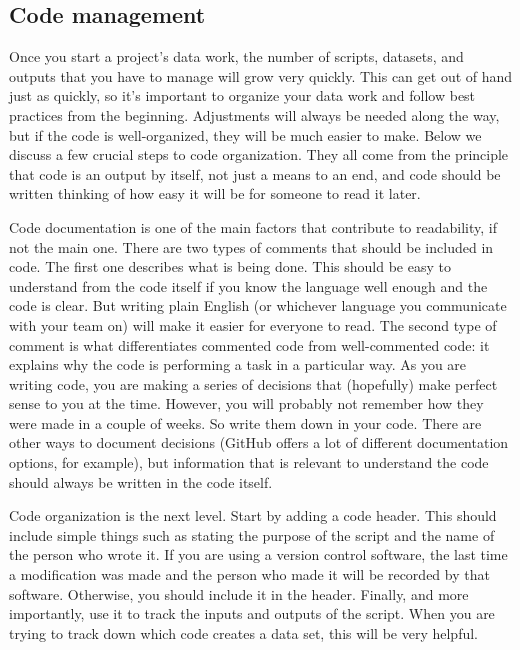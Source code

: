 \subsection{Code management}

Once you start a project's data work,
the number of scripts, datasets, and outputs that you have to manage will grow very quickly.
This can get out of hand just as quickly,
so it's important to organize your data work and follow best practices from the beginning.
Adjustments will always be needed along the way,
but if the code is well-organized, they will be much easier to make.
Below we discuss a few crucial steps to code organization.
They all come from the principle that code is an output by itself,
not just a means to an end,
and code should be written thinking of how easy it will be for someone to read it later.

Code documentation is one of the main factors that contribute to readability,
if not the main one.
There are two types of comments that should be included in code.
The first one describes what is being done.
This should be easy to understand from the code itself if you know the language well enough and the code is clear.
But writing plain English (or whichever language you communicate with your team on)
will make it easier for everyone to read.
The second type of comment is what differentiates commented code from well-commented code:
it explains why the code is performing a task in a particular way.
As you are writing code, you are making a series of decisions that
(hopefully) make perfect sense to you at the time.
However, you will probably not remember how they were made in a couple of weeks.
So write them down in your code.
There are other ways to document decisions
(GitHub offers a lot of different documentation options, for example),
but information that is relevant to understand the code should always be written in the code itself.

Code organization is the next level.
Start by adding a code header.
This should include simple things such as stating the purpose of the script and the name of the person who wrote it.
If you are using a version control software,
the last time a modification was made and the person who made it will be recorded by that software.
Otherwise, you should include it in the header.
Finally, and more importantly, use it to track the inputs and outputs of the script.
When you are trying to track down which code creates a data set, this will be very helpful.

